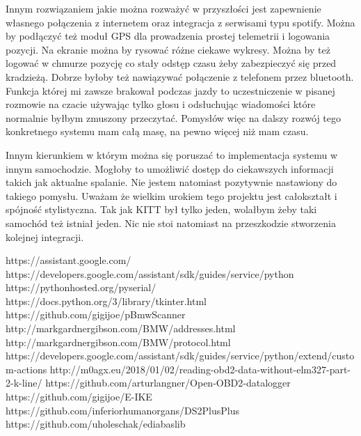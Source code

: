 \documentclass[declaration,shortabstract, inz]{iithesis}
\begin{document}
    Innym rozwiązaniem jakie można rozważyć w przyszłości jest zapewnienie własnego połączenia z internetem oraz integracja z serwisami typu spotify. Można by podłączyć też moduł GPS dla prowadzenia prostej telemetrii i logowania pozycji. Na ekranie można by rysować różne ciekawe wykresy. Można by też logować w chmurze pozycję co stały odstęp czasu żeby zabezpieczyć się przed kradzieżą. Dobrze byłoby też nawiązywać połączenie z telefonem przez bluetooth. Funkcja której mi zawsze brakował podczas jazdy to uczestniczenie w pisanej rozmowie na czacie używając tylko głosu i odsłuchując wiadomości które normalnie byłbym zmuszony przeczytać. Pomysłów więc na dalszy rozwój tego konkretnego systemu mam całą masę, na pewno więcej niż mam czasu.
    
    Innym kierunkiem w którym można się poruszać to implementacja systemu w innym samochodzie. Mogłoby to umożliwić dostęp do ciekawszych informacji takich jak aktualne spalanie. Nie jestem natomiast pozytywnie nastawiony do takiego pomysłu. Uważam że wielkim urokiem tego projektu jest całokształt i spójność stylistyczna. Tak jak KITT był tylko jeden, wolałbym żeby taki samochód też istniał jeden. Nic nie stoi natomiast na przeszkodzie stworzenia kolejnej integracji.


\begin{thebibliography}{2}
 https://assistant.google.com/
 https://developers.google.com/assistant/sdk/guides/service/python
 https://pythonhosted.org/pyserial/
 https://docs.python.org/3/library/tkinter.html
 https://github.com/gigijoe/pBmwScanner
 http://markgardnergibson.com/BMW/addresses.html
 http://markgardnergibson.com/BMW/protocol.html
 https://developers.google.com/assistant/sdk/guides/service/python/extend/custom-actions
 http://m0agx.eu/2018/01/02/reading-obd2-data-without-elm327-part-2-k-line/
 https://github.com/arturlangner/Open-OBD2-datalogger
 https://github.com/gigijoe/E-IKE
 https://github.com/inferiorhumanorgans/DS2PlusPlus
 https://github.com/uholeschak/ediabaslib
\end{thebibliography}
\end{document}
